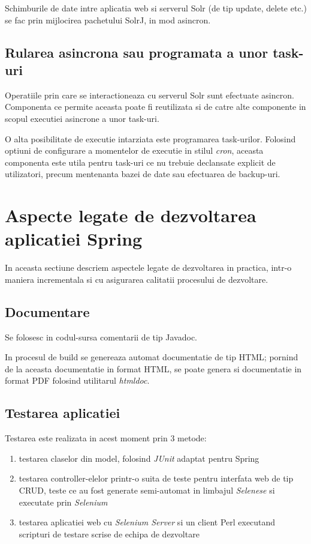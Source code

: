 Schimburile de date intre aplicatia web si serverul Solr (de tip update, delete
etc.) se fac prin mijlocirea pachetului SolrJ, in mod asincron.

\subsection{Rularea asincrona sau programata a unor task-uri}
Operatiile prin care se interactioneaza cu serverul Solr sunt efectuate
asincron.
Componenta ce permite aceasta poate fi reutilizata si de catre alte
componente in scopul executiei asincrone a unor task-uri.

O alta posibilitate de executie intarziata este programarea task-urilor.
Folosind optiuni de configurare a momentelor de executie in stilul \emph{cron},
aceasta componenta este utila pentru task-uri ce nu trebuie declansate explicit de
utilizatori, precum mentenanta bazei de date sau efectuarea de backup-uri.

\section{Aspecte legate de dezvoltarea aplicatiei Spring}
In aceasta sectiune descriem aspectele legate de dezvoltarea in practica, intr-o
maniera incrementala si cu asigurarea calitatii procesului de dezvoltare.

\subsection{Documentare}
Se folosesc in codul-sursa comentarii de tip Javadoc. 

In procesul de build se genereaza automat documentatie de tip HTML;
pornind de la aceasta documentatie in format HTML, se poate genera si documentatie in format PDF 
folosind utilitarul \emph{htmldoc}.

\subsection{Testarea aplicatiei}
Testarea este realizata in acest moment prin 3 metode:
\begin{enumerate}
\item
testarea claselor din model, folosind \emph{JUnit} adaptat pentru Spring
\item
testarea controller-elelor printr-o suita de teste pentru interfata web de tip CRUD, 
teste ce au fost generate semi-automat
in limbajul \emph{Selenese} 
si executate prin \emph{Selenium}
\item
testarea aplicatiei web cu \emph{Selenium Server} si un client Perl executand
scripturi de testare scrise de echipa de dezvoltare
\end{enumerate}

